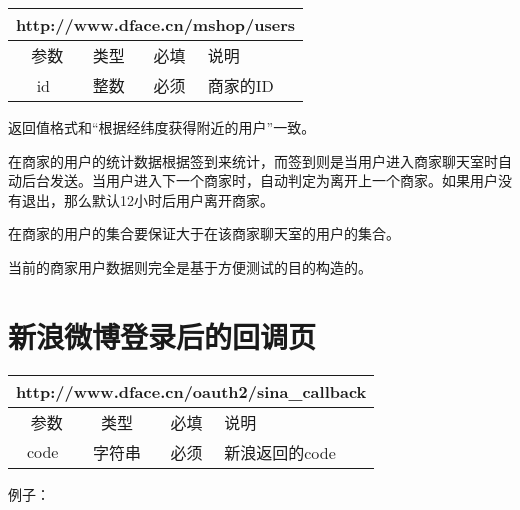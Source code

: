\documentclass[cs4size]{ctexartutf8}
\begin{document}
\begin{table}[H]
   \begin{center}
\begin{tabular}{|c|c|c|p{12cm}|}
\hline
\multicolumn{4}{|c|}{http://www.dface.cn/mshop/users} \\
\hline\hline
 \  参数  & 类型 & 必填 &  说明  \\
\hline
 id  & 整数 & 必须 & 商家的ID\\
\hline
\end{tabular}
   \end{center}
\end{table}

返回值格式和“根据经纬度获得附近的用户”一致。

在商家的用户的统计数据根据签到来统计，而签到则是当用户进入商家聊天室时自动后台发送。当用户进入下一个商家时，自动判定为离开上一个商家。如果用户没有退出，那么默认12小时后用户离开商家。

在商家的用户的集合要保证大于在该商家聊天室的用户的集合。

当前的商家用户数据则完全是基于方便测试的目的构造的。




\section{新浪微博登录后的回调页}

\begin{table}[H]
   \begin{center}
\begin{tabular}{|c|c|c|p{12cm}|}
\hline
\multicolumn{4}{|c|}{http://www.dface.cn/oauth2/sina\_callback} \\
\hline\hline
 \  参数  & 类型 & 必填 &  说明  \\
\hline
 code  & 字符串 & 必须 &  新浪返回的code\\
\hline
\end{tabular}
   \end{center}
\end{table}


例子：
\end{document}
